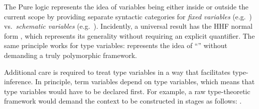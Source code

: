\begin{isabellebody}
\begin{isamarkuptext}
  The Pure logic represents the idea of variables being either inside
  or outside the current scope by providing separate syntactic
  categories for \emph{fixed variables} (e.g.\ ) vs.\
  \emph{schematic variables} (e.g.\ ).  Incidently, a
  universal result  has the HHF normal form , which represents its generality without requiring an
  explicit quantifier.  The same principle works for type variables:
   represents the idea of ``''
  without demanding a truly polymorphic framework.

  \medskip Additional care is required to treat type variables in a
  way that facilitates type-inference.  In principle, term variables
  depend on type variables, which means that type variables would have
  to be declared first.  For example, a raw type-theoretic framework
  would demand the context to be constructed in stages as follows:
  .


\end{isamarkuptext}
\end{isabellebody}
